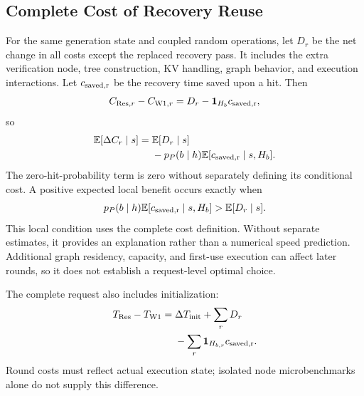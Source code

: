 \subsection{Complete Cost of Recovery Reuse}
\label{app:cost}
For the same generation state and coupled random operations, let $D_r$ be the net change in all costs except the replaced recovery pass. It includes the extra verification node, tree construction, KV handling, graph behavior, and execution interactions. Let $c_{\rm saved,r}$ be the recovery time saved upon a hit. Then
\begin{equation}
C_{\mathrm{Res},r}-C_{\mathrm{W1},r}=D_r-\mathbf{1}_{H_b}c_{\rm saved,r},
\end{equation}
so
\begin{align}
\mathbb{E}[\Delta C_r\mid s]
={}&\mathbb{E}[D_r\mid s]\nonumber\\
&-p_P(b\mid h)\mathbb{E}[c_{\rm saved,r}\mid s,H_b].
\end{align}
The zero-hit-probability term is zero without separately defining its conditional cost. A positive expected local benefit occurs exactly when
\begin{equation}
p_P(b\mid h)\mathbb{E}[c_{\rm saved,r}\mid s,H_b]>\mathbb{E}[D_r\mid s].
\end{equation}
This local condition uses the complete cost definition. Without separate estimates, it provides an explanation rather than a numerical speed prediction. Additional graph residency, capacity, and first-use execution can affect later rounds, so it does not establish a request-level optimal choice.

The complete request also includes initialization:
\begin{align}
T_{\mathrm{Res}}-T_{\mathrm{W1}}
={}&\Delta T_{\rm init}+\sum_rD_r\nonumber\\
&-\sum_r\mathbf{1}_{H_{b,r}}c_{\rm saved,r}.
\end{align}
Round costs must reflect actual execution state; isolated node microbenchmarks alone do not supply this difference.

